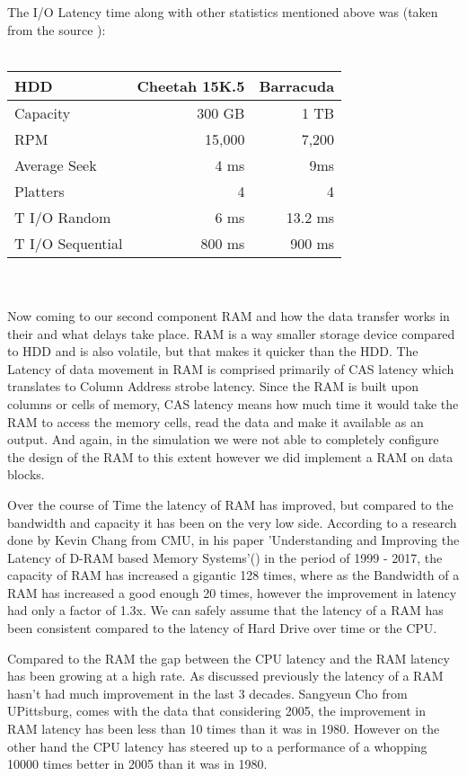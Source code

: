 \documentclass[12pt]{article}
\begin{document}
The I/O Latency time along with other statistics mentioned above was (taken from the source \cite{three}): 
\\\\
\begin{tabular}{|l|rr|}
  \hline
  HDD & Cheetah 15K.5 & Barracuda\\
  \hline
  Capacity & 300 GB & 1 TB\\
  \hline
  RPM & 15,000 & 7,200\\
  \hline
  Average Seek & 4 ms & 9ms\\
  \hline
  Platters & 4 & 4\\
  \hline
  T I/O Random & 6 ms & 13.2 ms\\
  \hline
  T I/O Sequential & 800 ms & 900 ms\\
  \hline
\end {tabular}
\\\\
Now coming to our second component RAM and how the data transfer works in their and what delays take place.
RAM is a way smaller storage device compared to HDD and is also volatile, but that makes it quicker than
the HDD. The Latency of data movement in RAM is comprised primarily of CAS latency which translates to
Column Address strobe latency. Since the RAM is built upon columns or cells of memory,
CAS latency means how much time it would take the RAM to access the memory cells, read the data and make it
available as an output. And again, in the simulation we were not able to completely configure the design of
the RAM to this extent however we did implement a RAM on data blocks.

Over the course of Time the latency of RAM has improved, but compared to the bandwidth and capacity it has
been on the very low side. According to a research done by Kevin Chang from CMU, in his paper 'Understanding
and Improving the Latency of D-RAM based Memory Systems'(\cite {DRAMTimings}) in the period of 1999 - 2017,
the capacity of RAM has increased a gigantic 128 times, where as the Bandwidth of a RAM has increased a
good enough 20 times, however the improvement in latency had  only a factor of 1.3x. We can safely assume
that the latency of a RAM has been consistent compared to the latency of Hard Drive over time or the CPU.

Compared to the RAM the gap between the CPU latency and the RAM latency has been growing at a high rate. As
discussed previously the latency of a RAM hasn't had much improvement in the last 3 decades. Sangyeun Cho
from UPittsburg, comes with the data that considering 2005, the improvement in RAM latency has been less than
10 times than it was in 1980. However on the other hand the CPU latency has steered up to a performance of
a whopping 10000 times better in 2005 than it was in 1980.
\end{document}
